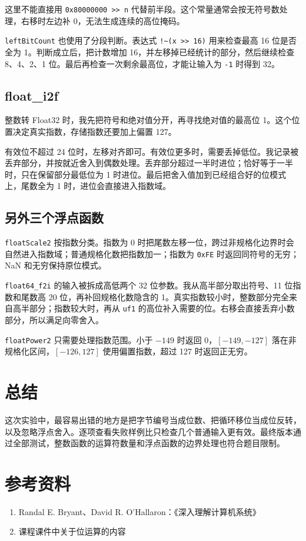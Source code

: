 \documentclass[UTF8,zihao=-4]{ctexart}
\begin{document}
这里不能直接用 \texttt{0x80000000 >> n} 代替前半段。这个常量通常会按无符号数处理，右移时左边补 0，无法生成连续的高位掩码。

\texttt{leftBitCount} 也使用了分段判断。表达式 \verb|!~(x >> 16)| 用来检查最高 16 位是否全为 1。判断成立后，把计数增加 16，并左移掉已经统计的部分，然后继续检查 8、4、2、1 位。最后再检查一次剩余最高位，才能让输入为 \texttt{-1} 时得到 32。

\subsection{float\_i2f}

整数转 Float32 时，我先把符号和绝对值分开，再寻找绝对值的最高位 1。这个位置决定真实指数，存储指数还要加上偏置 127。

有效位不超过 24 位时，左移对齐即可。有效位更多时，需要丢掉低位。我记录被丢弃部分，并按就近舍入到偶数处理。丢弃部分超过一半时进位；恰好等于一半时，只在保留部分最低位为 1 时进位。最后把舍入值加到已经组合好的位模式上，尾数全为 1 时，进位会直接进入指数域。

\subsection{另外三个浮点函数}

\texttt{floatScale2} 按指数分类。指数为 0 时把尾数左移一位，跨过非规格化边界时会自然进入指数域；普通规格化数把指数加一；指数为 \texttt{0xFE} 时返回同符号的无穷；NaN 和无穷保持原位模式。

\texttt{float64\_f2i} 的输入被拆成高低两个 32 位参数。我从高半部分取出符号、11 位指数和尾数高 20 位，再补回规格化数隐含的 1。真实指数较小时，整数部分完全来自高半部分；指数较大时，再从 \texttt{uf1} 的高位补入需要的位。右移会直接丢弃小数部分，所以满足向零舍入。

\texttt{floatPower2} 只需要处理指数范围。小于 $-149$ 时返回 0，$[-149,-127]$ 落在非规格化区间，$[-126,127]$ 使用偏置指数，超过 127 时返回正无穷。

\section{总结}

这次实验中，最容易出错的地方是把字节编号当成位数、把循环移位当成位反转，以及忽略浮点舍入。逐项查看失败样例比只检查几个普通输入更有效。最终版本通过全部测试，整数函数的运算符数量和浮点函数的边界处理也符合题目限制。

\section{参考资料}

\begin{enumerate}
  \item Randal E. Bryant、David R. O'Hallaron：《深入理解计算机系统》
  \item 课程课件中关于位运算的内容
\end{enumerate}
\end{document}
